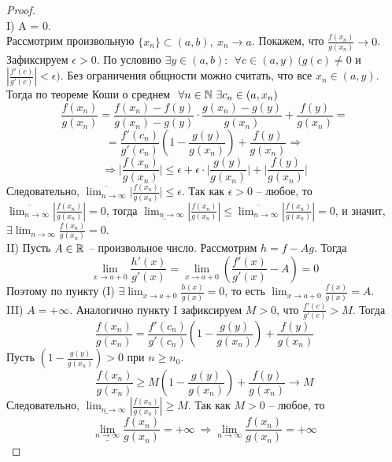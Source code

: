     \begin{proof} \ \\
        I) A = 0.\\
        Рассмотрим произвольную $\{x_n\} \subset (a, b), \ x_n \to a$.
        Покажем, что $\frac{f(x_n)}{g(x_n)} \to 0$. Зафиксируем $\epsilon > 0$.
        По условию $\exists y \in (a, b): \ \ \forall c \in (a, y) \ (g(c) \neq 0$ и $|\frac{f'(c)}{g'(c)}| < \epsilon)$.
        Без ограничения общности можно считать, что все $x_n \in (a, y)$.
        Тогда по теореме Коши о среднем $\ \forall n \in \mathbb{N} \ \exists c_n \in (a, x_n)$
        \[\frac{f(x_n)}{g(x_n)} = \frac{f(x_n)-f(y)}{g(x_n)-g(y)} \cdot \frac{g(x_n)-g(y)}{g(x_n)} + \frac{f(y)}{g(x_n)} =\] 
        \[= \frac{f'(c_n)}{g'(c_n)}(1-\frac{g(y)}{g(x_n)}) + \frac{f(y)}{g(x_n)} \Rightarrow\]
        \[\Rightarrow \lvert\frac{f(x_n)}{g(x_n)}\rvert \leq \epsilon + \epsilon \cdot \lvert\frac{g(y)}{g(x_{n})}\rvert + \lvert \frac{f(y)}{g(x_{n})} \rvert\]
        Следовательно, $\overline{\lim_{n \to \infty}} \lvert\frac{f(x_n)}{g(x_n)}\rvert \leq \epsilon$.
        Так как $\epsilon > 0$ -- любое, то $\overline{\lim_{n \to \infty}} |\frac{f(x_n)}{g(x_n)}| = 0$,
        тогда $\underline{\lim_{n \to \infty}} |\frac{f(x_n)}{g(x_n)}| \leq \overline{\lim_{n \to \infty}} |\frac{f(x_n)}{g(x_n)}| = 0$,
        и значит, $\exists \lim_{n \to \infty} \frac{f(x_n)}{g(x_n)} = 0$.\\
        II) Пусть $A \in \mathbb{R}$ -- произвольное число. Рассмотрим $h = f - Ag$.
        Тогда \[\lim_{x \to a+0} \frac{h'(x)}{g'(x)} = \lim_{x \to a+0} (\frac{f'(x)}{g'(x)} - A) = 0\]
        Поэтому по пункту (I) $\exists \lim_{x\to a+0} \frac{h(x)}{g(x)} = 0$, то есть $\lim_{x\to a+0} \frac{f(x)}{g(x)} = A$.\\
        III) $A = +\infty$. Аналогично пункту I зафиксируем $M > 0$, что $\frac{f'(c)}{g'(c)} > M$.
        Тогда \[\frac{f(x_n)}{g(x_n)} = \frac{f'(c_n)}{g'(c_n)}(1-\frac{g(y)}{g(x_n)}) + \frac{f(y)}{g(x_n)}\]
        Пусть $(1-\frac{g(y)}{g(x_n)}) > 0$ при $n \geq n_0$.
        \[\frac{f(x_n)}{g(x_n)} \geq M(1-\frac{g(y)}{g(x_n)}) + \frac{f(y)}{g(x_n)} \to M\]
        Следовательно, $\underline{\lim_{n \to \infty}} |\frac{f(x_n)}{g(x_n)}| \geq M$.
        Так как $M > 0$ -- любое, то \[\underline{\lim_{n \to \infty}} \frac{f(x_n)}{g(x_n)} = +\infty\ \Rightarrow \lim_{n \to \infty} \frac{f(x_n)}{g(x_n)} = +\infty\]
    \end{proof}